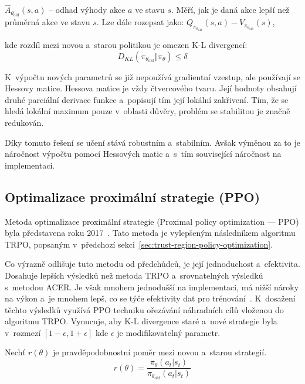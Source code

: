 \begin{myitemize}
  \item $\hat{A}_{\theta_{\text{old}}}(s, a)$ -- odhad výhody akce $a$ ve stavu $s$. Měří, jak je daná akce lepší než průměrná akce ve stavu $s$. Lze dále rozepsat jako: $Q_{\pi_{\theta_{\text{old}}}}(s, a) - V_{\pi_{\theta_{\text{old}}}}(s)$,
\end{myitemize}
kde rozdíl mezi novou a~starou politikou je omezen K-L divergencí:
\begin{equation}
  \label{eq:kl_divergence}
    D_{KL}(\pi_{\theta_{\text{old}}} \Vert \pi_{\theta}) \le \delta
\end{equation}

K~výpočtu nových parametrů se již nepoužívá gradientní vzestup, ale používají se Hessovy matice.
Hessova matice je vždy čtvercového tvaru.
Její hodnoty obsahují druhé parciální derivace funkce a~popisují tím její lokální zakřivení.
Tím, že se hledá lokální maximum pouze v~oblasti důvěry, problém se stabilitou je značně redukován.

Díky tomuto řešení se učení stává robustním a~stabilním.
Avšak výměnou za to je náročnost výpočtu pomocí Hessových matic a~s~tím související náročnost na implementaci.

\subsection{Optimalizace proximální strategie (PPO)}
\label{sec:proximalni-optimalizace-strategie}

Metoda optimalizace proximální strategie (Proximal policy optimization --- PPO) byla představena roku 2017~\cite{PPO_paper}.
Tato metoda je vylepšeným následníkem algoritmu TRPO, popsaným v~předchozí sekci~\ref{sec:trust-region-policy-optimization}.

Co výrazně odlišuje tuto metodu od předchůdců, je její jednoduchost a~efektivita.
Dosahuje lepších výsledků než metoda TRPO a~srovnatelných výsledků s~metodou ACER\@.
Je však mnohem jednodušší na implementaci, má nižší nároky na výkon a~je mnohem lepš, co se týče efektivity dat pro trénování~\cite{PPO_paper}.
K~dosažení těchto výsledků využívá PPO techniku ořezávání náhradních cílů vloženou do algoritmu TRPO\@.
Vynucuje, aby K-L divergence staré a~nové strategie byla v~rozmezí $[1-\epsilon, 1+\epsilon]$ kde $\epsilon$ je modifikovatelný parametr.

\pagebreak

Nechť $r(\theta)$ je pravděpodobnostní poměr mezi novou a~starou strategií.
\begin{equation}
  r(\theta) = \frac{\pi_\theta(a_t \vert s_t)}{\pi_{\theta_{\text{old}}}(a_t \vert s_t)}
\end{equation}

